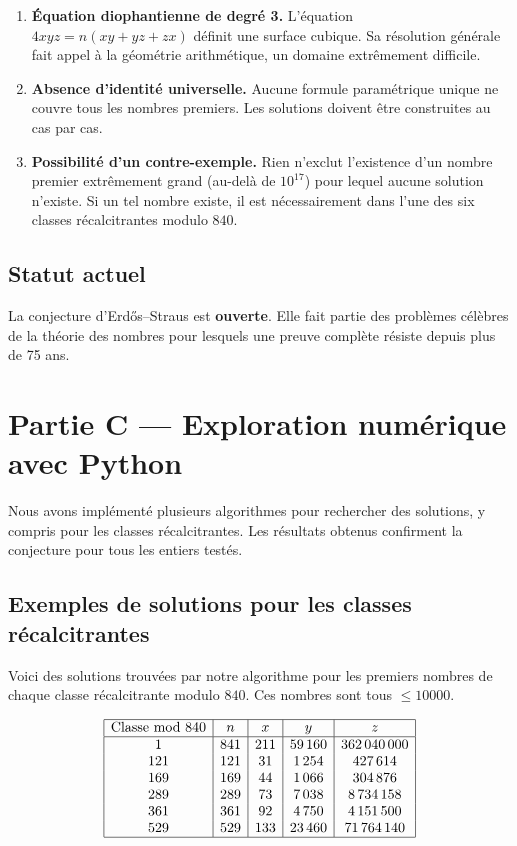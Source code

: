 \documentclass[12pt,a4paper]{article}
\begin{document}
\begin{enumerate}[label=(\arabic*)]
    \item \textbf{Équation diophantienne de degré 3.} L'équation $4xyz = n(xy + yz + zx)$ définit une surface cubique. Sa résolution générale fait appel à la géométrie arithmétique, un domaine extrêmement difficile.
    \item \textbf{Absence d'identité universelle.} Aucune formule paramétrique unique ne couvre tous les nombres premiers. Les solutions doivent être construites au cas par cas.
    \item \textbf{Possibilité d'un contre-exemple.} Rien n'exclut l'existence d'un nombre premier extrêmement grand (au-delà de $10^{17}$) pour lequel aucune solution n'existe. Si un tel nombre existe, il est nécessairement dans l'une des six classes récalcitrantes modulo $840$.
\end{enumerate}

\subsection{Statut actuel}

La conjecture d'Erdős--Straus est \textbf{ouverte}. Elle fait partie des problèmes célèbres de la théorie des nombres pour lesquels une preuve complète résiste depuis plus de 75 ans.

\section{Partie C --- Exploration numérique avec Python}

Nous avons implémenté plusieurs algorithmes pour rechercher des solutions, y compris pour les classes récalcitrantes. Les résultats obtenus confirment la conjecture pour tous les entiers testés.

\subsection{Exemples de solutions pour les classes récalcitrantes}

Voici des solutions trouvées par notre algorithme pour les premiers nombres de chaque classe récalcitrante modulo $840$. Ces nombres sont tous $\le 10000$.

\[
\begin{array}{|c|c|c|c|c|}
\hline
\text{Classe mod } 840 & n & x & y & z \\
\hline
1    & 841    & 211      & 59\,160        & 362\,040\,000 \\
121  & 121    & 31       & 1\,254         & 427\,614 \\
169  & 169    & 44       & 1\,066         & 304\,876 \\
289  & 289    & 73       & 7\,038         & 8\,734\,158 \\
361  & 361    & 92       & 4\,750         & 4\,151\,500 \\
529  & 529    & 133      & 23\,460        & 71\,764\,140 \\
\hline
\end{array}
\]
\end{document}
